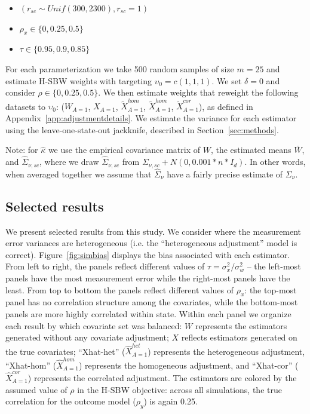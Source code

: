 \begin{itemize}
    \item $(r_{sc} \sim Unif(300, 2300), r_{sc} = 1)$ 
    \item $\rho_x \in \{0, 0.25, 0.5\}$
    \item $\tau \in \{0.95, 0.9, 0.85\}$
\end{itemize}

For each parameterization we take 500 random samples of size $m = 25$ and estimate H-SBW weights with targeting $\upsilon_0 = c(1, 1, 1)$. We set $\delta = 0$ and consider $\rho \in \{0, 0.25, 0.5\}$. We then estimate weights that reweight the following datasets to $\upsilon_0$: ($W_{A=1}$, $X_{A=1}$, $\tilde{X}_{A=1}^{hom}$, $\tilde{X}_{A=1}^{hom}$, $\tilde{X}_{A=1}^{cor}$), as defined in Appendix~\ref{app:adjustmentdetails}. We estimate the variance for each estimator using the leave-one-state-out jackknife, described in Section~\ref{sec:methods}.
 
Note: for $\hat{\kappa}$ we use the empirical covariance matrix of $W$, the estimated means $\bar{W}$, and $\hat{\Sigma}_{\nu, sc}$, where we draw $\hat{\Sigma}_{\nu, sc}$ from $\Sigma_{\nu, sc} + N(0, 0.001*n*I_d)$. In other words, when averaged together we assume that $\hat{\Sigma}_{\nu}$ have a fairly precise estimate of $\Sigma_{\nu}$.

\subsection{Selected results}

We present selected results from this study. We consider where the measurement error variances are heterogeneous (i.e. the ``heterogeneous adjustment'' model is correct). Figure~\ref{fig:simbias} displays the bias associated with each estimator. From left to right, the panels reflect different values of $\tau = \sigma^2_x/\sigma^2_w$ -- the left-most panels have the most measurement error while the right-most panels have the least. From top to bottom the panels reflect different values of $\rho_x$: the top-most panel has no correlation structure among the covariates, while the bottom-most panels are more highly correlated within state. Within each panel we organize each result by which covariate set was balanced: $W$ represents the estimators generated without any covariate adjustment; $X$ reflects estimators generated on the true covariates; ``Xhat-het'' ($\hat{X}_{A=1}^{het}$) represents the heterogeneous adjustment, ``Xhat-hom'' ($\hat{X}_{A=1}^{hom}$) represents the homogeneous adjustment, and ``Xhat-cor'' ($\hat{X}_{A=1}^{cor}$) represents the correlated adjustment. The estimators are colored by the assumed value of $\rho$ in the H-SBW objective: across all simulations, the true correlation for the outcome model ($\rho_y$) is again 0.25.

